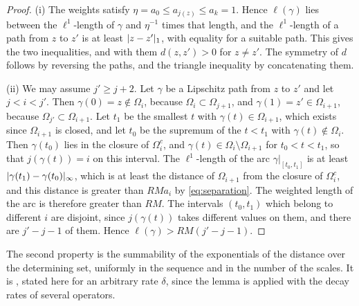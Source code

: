 \documentclass[11pt]{preprint}
\DeclarePairedDelimiter{\abs}{\lvert}{\rvert}
\numberwithin{equation}{section}
\begin{document}
\begin{proof}
(i) The weights satisfy $\eta = a_0 \leqslant a_{j(z)} \leqslant a_k = 1$. Hence $\ell(\gamma)$ lies between the $\ell^1$-length of $\gamma$ and $\eta^{-1}$ times that length, and the $\ell^1$-length of a path from $z$ to $z'$ is at least $\abs{z - z'}_1$, with equality for a suitable path. This gives the two inequalities, and with them $d(z, z') > 0$ for $z \neq z'$. The symmetry of $d$ follows by reversing the paths, and the triangle inequality by concatenating them.

(ii) We may assume $j' \geqslant j + 2$. Let $\gamma$ be a Lipschitz path from $z$ to $z'$ and let $j < i < j'$. Then $\gamma(0) = z \notin \Omega_i$, because $\Omega_i \subset \Omega_{j+1}$, and $\gamma(1) = z' \in \Omega_{i+1}$, because $\Omega_{j'} \subset \Omega_{i+1}$. Let $t_1$ be the smallest $t$ with $\gamma(t) \in \Omega_{i+1}$, which exists since $\Omega_{i+1}$ is closed, and let $t_0$ be the supremum of the $t < t_1$ with $\gamma(t) \notin \Omega_i$. Then $\gamma(t_0)$ lies in the closure of $\Omega_i^c$, and $\gamma(t) \in \Omega_i \setminus \Omega_{i+1}$ for $t_0 < t < t_1$, so that $j(\gamma(t)) = i$ on this interval. The $\ell^1$-length of the arc $\gamma|_{[t_0, t_1]}$ is at least $\abs{\gamma(t_1) - \gamma(t_0)}_\infty$, which is at least the distance of $\Omega_{i+1}$ from the closure of $\Omega_i^c$, and this distance is greater than $RMa_i$ by \eqref{eq:separation}. The weighted length of the arc is therefore greater than $RM$. The intervals $(t_0, t_1)$ which belong to different $i$ are disjoint, since $j(\gamma(t))$ takes different values on them, and there are $j' - j - 1$ of them. Hence $\ell(\gamma) > RM(j' - j - 1)$.
\end{proof}

The second property is the summability of the exponentials of the distance over the determining set, uniformly in the sequence and in the number of the scales. It is \cite[Lemma~2.1, p.~234]{BalabanPRT2}, stated here for an arbitrary rate $\delta$, since the lemma is applied with the decay rates of several operators.
\end{document}

